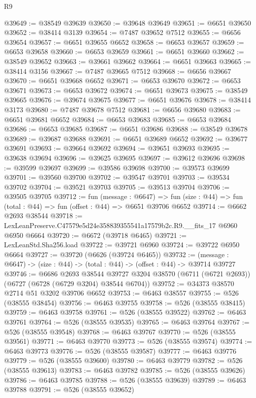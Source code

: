 \begin{lexlean}{R9}
\begin{coremodule}
@39649 := @38549 @39639
@39650 := @39648 @39649
@39651 := @6651 @39650
@39652 := @38414 @3139
@39654 := @7487 @39652 @7512
@39655 := @6656 @39654
@39657 := @6651 @39655 @6652
@39658 := @6653 @39657
@39659 := @6653 @39658
@39660 := @6653 @39659
@39661 := @6651 @39660
@39662 := @38549 @39652
@39663 := @39661 @39662
@39664 := @6651 @39663
@39665 := @38414 @3156
@39667 := @7487 @39665 @7512
@39668 := @6656 @39667
@39670 := @6651 @39668 @6652
@39671 := @6653 @39670
@39672 := @6653 @39671
@39673 := @6653 @39672
@39674 := @6651 @39673
@39675 := @38549 @39665
@39676 := @39674 @39675
@39677 := @6651 @39676
@39678 := @38414 @3173
@39680 := @7487 @39678 @7512
@39681 := @6656 @39680
@39683 := @6651 @39681 @6652
@39684 := @6653 @39683
@39685 := @6653 @39684
@39686 := @6653 @39685
@39687 := @6651 @39686
@39688 := @38549 @39678
@39689 := @39687 @39688
@39691 := @6651 @39689 @6652
@39692 := @39677 @39691
@39693 := @39664 @39692
@39694 := @39651 @39693
@39695 := @39638 @39694
@39696 := @39625 @39695
@39697 := @39612 @39696
@39698 := @39599 @39697
@39699 := @39586 @39698
@39700 := @39573 @39699
@39701 := @39560 @39700
@39702 := @39547 @39701
@39703 := @39534 @39702
@39704 := @39521 @39703
@39705 := @39513 @39704
@39706 := @39505 @39705
@39712 := fun (message : @6647) =>
  fun (size : @44) => fun (total : @44) => fun (offset : @44) => @6651 @39706 @6652
@39714 := @6662 @2693 @38544
@39718 := LexLeanPreserve.C47579e5d24e358839355541a17579b2c.R9.__fits_17 @6960 @6950 @6664
@39720 := @6672 (@39718 @6465)
@39721 := LexLeanStd.Sha256.load
@39722 := @39721 @6960
@39724 := @39722 @6950 @6664
@39727 := @39720 (@6626 (@39724 @6465))
@39732 := (message : @6647) -> (size : @44) -> (total : @44) -> (offset : @44) -> @39714 @39727
@39746 := @6686
    @2693
    @38544
    @39727
    @3204
    @38570
    (@6711 (@6721 @2693))
    (@6727 (@6728 (@6729 @3204) @38544 @6704))
@39752 := @34373 @38570 @2714 @51 @3202 @39706 @6652
@39753 := @6463 @38557
@39755 := @526 (@38555 @38454)
@39756 := @6463 @39755
@39758 := @526 (@38555 @38415)
@39759 := @6463 @39758
@39761 := @526 (@38555 @39522)
@39762 := @6463 @39761
@39764 := @526 (@38555 @39535)
@39765 := @6463 @39764
@39767 := @526 (@38555 @39548)
@39768 := @6463 @39767
@39770 := @526 (@38555 @39561)
@39771 := @6463 @39770
@39773 := @526 (@38555 @39574)
@39774 := @6463 @39773
@39776 := @526 (@38555 @39587)
@39777 := @6463 @39776
@39779 := @526 (@38555 @39600)
@39780 := @6463 @39779
@39782 := @526 (@38555 @39613)
@39783 := @6463 @39782
@39785 := @526 (@38555 @39626)
@39786 := @6463 @39785
@39788 := @526 (@38555 @39639)
@39789 := @6463 @39788
@39791 := @526 (@38555 @39652)

\end{coremodule}
\end{lexlean}
